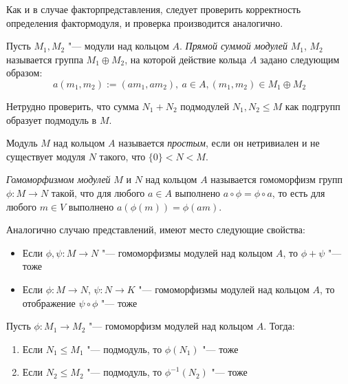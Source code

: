 \begin{note}
	Как и в случае факторпредставления, следует проверить корректность определения фактормодуля, и проверка производится аналогично.
\end{note}

\begin{definition}
	Пусть $M_1, M_2$ "--- модули над кольцом $A$. \textit{Прямой суммой модулей} $M_1$, $M_2$ называется группа $M_1 \oplus M_2$, на которой действие кольца $A$ задано следующим образом:
	\[a(m_1, m_2) := (am_1, am_2),~a \in A, (m_1, m_2) \in M_1 \oplus M_2\]
\end{definition}

\begin{note}
	Нетрудно проверить, что сумма $N_1 + N_2$ подмодулей $N_1, N_2 \le M$ как подгрупп образует подмодуль в $M$.
\end{note}

\begin{definition}
	Модуль $M$ над кольцом $A$ называется \textit{простым}, если он нетривиален и не существует модуля $N$ такого, что $\{0\} < N < M$.
\end{definition}

\begin{definition}
	\textit{Гомоморфизмом модулей} $M$ и $N$ над кольцом $A$ называется гомоморфизм групп $\phi : M \to N$ такой, что для любого $a \in A$ выполнено $a\circ\phi = \phi\circ a$, то есть для любого $m \in V$ выполнено $a(\phi(m)) = \phi(am)$.
\end{definition}

\begin{note}
	Аналогично случаю представлений, имеют место следующие свойства:
	\begin{itemize}
		\item Если $\phi, \psi: M \to N$ "--- гомоморфизмы модулей над кольцом $A$, то $\phi + \psi$ "--- тоже
		\item Если $\phi: M \to N$, $\psi: N \to K$ "--- гомоморфизмы модулей над кольцом $A$, то отображение $\psi \circ \phi$ "--- тоже
	\end{itemize}
\end{note}

\begin{proposition}
	Пусть $\phi : M_1 \to M_2$ "--- гомоморфизм модулей над кольцом $A$. Тогда:
	\begin{enumerate}
		\item Если $N_1 \le M_1$ "--- подмодуль, то $\phi(N_1)$ "--- тоже
		\item Если $N_2 \le M_2$ "--- подмодуль, то $\phi^{-1}(N_2)$ "--- тоже
	\end{enumerate}
\end{proposition}


